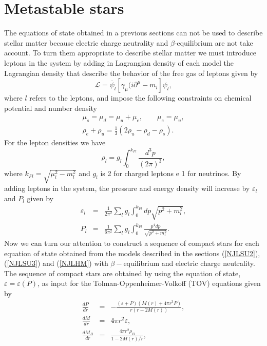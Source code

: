 \documentclass[prc, reprint, amsmath, floatfix,10pt]{revtex4-1}
\begin{document}
\section{Metastable stars}
The equations of state obtained in a previous sections can not be used to describe
stellar matter because electric charge neutrality and $\beta$-equilibrium are not take
account. To turn them appropriate to describe stellar matter we must introduce leptons in
the system by adding in Lagrangian density of each model the Lagrangian density that
describe the behavior of the free gas of leptons given by
\begin{equation}
\mathscr{L}=\overline{\psi}_l[\gamma_\mu(i\partial^\mu -m_l]\psi_l,
\end{equation}
where $l$ refers to the leptons, and impose the following constraints on chemical
potential and number density
\begin{eqnarray}
\mu_s=\mu_d=\mu_u+\mu_e, \qquad \mu_e=\mu_u, \\
\rho_e+\rho_u=\frac{1}{3}(2\rho_u-\rho_d-\rho_s).
\end{eqnarray}
For the lepton densities we have
\begin{equation}
\rho_l=g_l\int_0^{k_{Fl}}\frac{d^3p}{(2\pi)^3},
\end{equation}
where $k_{Fl}=\sqrt{\mu_l^2-m_l^2}$ and $g_l$ is  2 for charged leptons e 1 for neutrinos.
By adding leptons in the system,
the pressure and energy density will increase by $\varepsilon_l$ and $P_l$ given by
\begin{eqnarray}
\varepsilon_l&=&\frac{1}{2\pi^2}\sum_lg_l\int_0^{k_{Fl}} dp\sqrt{p^2+m_l^2},\\
P_l&=&\frac{1}{6\pi^2}\sum_lg_l\int_0^{k_{Fl}} \frac{p^4dp}{\sqrt{p^2+m_l^2}}.
\end{eqnarray}
Now we can turn our attention to construct a sequence of compact stars for each
equation of state obtained from the models described in the sections (\ref{NJLSU2}),
(\ref{NJLSU3}) and (\ref{NJLHM}) with $\beta-$equilibrium and electric charge neutrality.
The sequence of compact stars are obtained by using the equation of state, $\varepsilon=\varepsilon(P)$,
as input for the Tolman-Oppenheimer-Volkoff (TOV) equations given by
\begin{eqnarray}
\frac{dP}{dr}&=&-\frac{(\varepsilon+P)(M(r)+4\pi r^3P)}{r(r-2M(r))},\\
\frac{dM}{dr}&=&4\pi r^2\varepsilon,\\
\frac{dM_B}{dr}&=&\frac{4\pi r^2\rho_B}{1-2M(r)/r},
\end{eqnarray}
\end{document}
